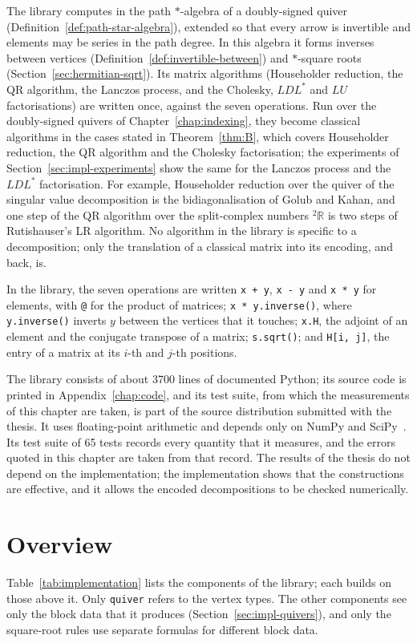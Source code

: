 \documentclass[12pt, a4paper]{report}
\theoremstyle{plain}
\theoremstyle{definition}
\theoremstyle{remark}
\theoremstyle{plain}
\newcommand{\twoR}{{}^{2}\mathbb{R}}
\begin{document}
The library computes in the path $*$-algebra of a doubly-signed quiver (Definition~\ref{def:path-star-algebra}), extended so that every arrow is invertible and elements may be series in the path degree. In this algebra it forms inverses between vertices (Definition~\ref{def:invertible-between}) and $*$-square roots (Section~\ref{sec:hermitian-sqrt}). Its matrix algorithms (Householder reduction, the QR algorithm, the Lanczos process, and the Cholesky, $LDL^*$ and $LU$ factorisations) are written once, against the seven operations. Run over the doubly-signed quivers of Chapter~\ref{chap:indexing}, they become classical algorithms in the cases stated in Theorem~\ref{thm:B}, which covers Householder reduction, the QR algorithm and the Cholesky factorisation; the experiments of Section~\ref{sec:impl-experiments} show the same for the Lanczos process and the $LDL^*$ factorisation. For example, Householder reduction over the quiver of the singular value decomposition is the bidiagonalisation of Golub and Kahan, and one step of the QR algorithm over the split-complex numbers $\twoR$ is two steps of Rutishauser's LR algorithm. No algorithm in the library is specific to a decomposition; only the translation of a classical matrix into its encoding, and back, is.

In the library, the seven operations are written \texttt{x + y}, \texttt{x - y} and \texttt{x * y} for elements, with \texttt{@} for the product of matrices; \texttt{x * y.inverse()}, where \texttt{y.inverse()} inverts $y$ between the vertices that it touches; \texttt{x.H}, the adjoint of an element and the conjugate transpose of a matrix; \texttt{s.sqrt()}; and \texttt{H[i, j]}, the entry of a matrix at its $i$-th and $j$-th positions.

The library consists of about 3700 lines of documented Python; its source code is printed in Appendix~\ref{chap:code}, and its test suite, from which the measurements of this chapter are taken, is part of the source distribution submitted with the thesis. It uses floating-point arithmetic and depends only on NumPy and SciPy~\cite{Harris2020NumPy,Virtanen2020SciPy}. Its test suite of 65 tests records every quantity that it measures, and the errors quoted in this chapter are taken from that record. The results of the thesis do not depend on the implementation; the implementation shows that the constructions are effective, and it allows the encoded decompositions to be checked numerically.

\section{Overview}
\label{sec:impl-overview}
Table~\ref{tab:implementation} lists the components of the library; each builds on those above it. Only \texttt{quiver} refers to the vertex types. The other components see only the block data that it produces (Section~\ref{sec:impl-quivers}), and only the square-root rules use separate formulas for different block data.
\end{document}
